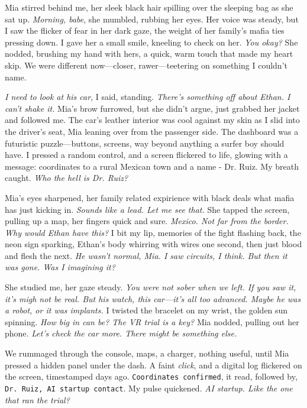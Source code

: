 \documentclass[12pt,oneside]{book} %
\newcommand{\note}[1]{\texttt{#1}}
\begin{document}
Mia stirred behind me, her sleek black hair spilling over the sleeping bag as she sat up. \textit{Morning, babe}, she mumbled, rubbing her eyes. Her voice was steady, but I saw the flicker of fear in her dark gaze, the weight of her family’s mafia ties pressing down. I gave her a small smile, kneeling to check on her. \textit{You okay?} She nodded, brushing my hand with hers, a quick, warm touch that made my heart skip. We were different now—closer, rawer—teetering on something I couldn’t name.

\textit{I need to look at his car}, I said, standing. \textit{There’s something off about Ethan. I can’t shake it.} Mia’s brow furrowed, but she didn’t argue, just grabbed her jacket and followed me. The car’s leather interior was cool against my skin as I slid into the driver’s seat, Mia leaning over from the passenger side. The dashboard was a futuristic puzzle—buttons, screens, way beyond anything a surfer boy should have. I pressed a random control, and a screen flickered to life, glowing with a message: coordinates to a rural Mexican town and a name - \textnormal{Dr. Ruiz}. My breath caught. \textit{Who the hell is Dr. Ruiz?}

Mia’s eyes sharpened, her family related expirience with black deals what mafia has just kicking in. \textit{Sounds like a lead. Let me see that.} She tapped the screen, pulling up a map, her fingers quick and sure. \textit{Mexico. Not far from the border. Why would Ethan have this?} I bit my lip, memories of the fight flashing back, the neon sign sparking, Ethan’s body whirring with wires one second, then just blood and flesh the next. \textit{He wasn’t normal, Mia. I saw circuits, I think. But then it was gone. Was I imagining it?}

She studied me, her gaze steady. \textit{You were not sober when we left. If you saw it, it’s migh not be real. But his watch, this car—it’s all too advanced. Maybe he was a robot, or it was implants.} I twisted the bracelet on my wrist, the golden sun spinning. \textit{How big in can be? The VR trial is a key?} Mia nodded, pulling out her phone. \textit{Let’s check the car more. There might be something else.}

We rummaged through the console, maps, a charger, nothing useful, until Mia pressed a hidden panel under the dash. A faint \textit{click}, and a digital log flickered on the screen, timestamped days ago. \note{Coordinates confirmed}, it read, followed by, \note{Dr. Ruiz, AI startup contact}. My pulse quickened. \textit{AI startup. Like the one that ran the trial?}
\end{document}
